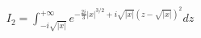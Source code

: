\documentclass[preview]{standalone}
\begin{document}
\begin{align*}
I_2=\displaystyle \int_{-i\sqrt{|x|}}^{+\infty}e^{-\frac{2i}{3}|x|^{3/2}+i\sqrt{|x|}(z-\sqrt{|x|})^2}dz
\end{align*}
\end{document}
